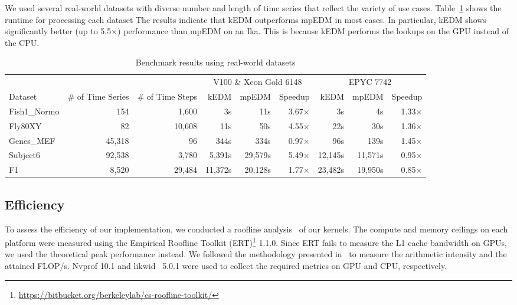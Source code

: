 \documentclass[conference]{IEEEtran}
\begin{document}
We used several real-world datasets with diverse number and length of time
series that reflect the variety of use cases.
Table~\ref{tbl:real-world} shows the runtime for processing each dataset The
results indicate that kEDM outperforms mpEDM in most cases. In particular,
kEDM shows significantly better (up to 5.5$\times$) performance than mpEDM on
an Ika\@. This is because kEDM performs the lookups on the GPU instead of the
CPU\@.

\begin{table}
\centering
\caption{Benchmark results using real-world datasets}%
\label{tbl:real-world}
\begin{tabular}{@{}lrrrrrrrr@{}}
\toprule
             & \multicolumn{1}{c}{} & \multicolumn{1}{c}{} & \multicolumn{3}{c}{V100 \& Xeon Gold 6148 } & \multicolumn{3}{c}{EPYC 7742} \\ \cmidrule(l){4-6}  \cmidrule(l){7-9}
Dataset      & \multicolumn{1}{c}{\# of Time Series} & \multicolumn{1}{c}{\# of Time Steps} & kEDM & mpEDM & Speedup & kEDM & mpEDM & Speedup \\ \midrule
Fish1\_Normo & 154    & 1,600  &      3s &     11s & 3.67$\times$ &      3s &      4s & 1.33$\times$ \\
Fly80XY      & 82     & 10,608 &     11s &     50s & 4.55$\times$ &     22s &     30s & 1.36$\times$ \\
Genes\_MEF   & 45,318 & 96     &    344s &    334s & 0.97$\times$ &     96s &    139s & 1.45$\times$ \\
Subject6     & 92,538 & 3,780  &  5,391s & 29,579s & 5.49$\times$ & 12,145s & 11,571s & 0.95$\times$ \\
F1           & 8,520  & 29,484 & 11,372s & 20,128s & 1.77$\times$ & 23,482s & 19,950s & 0.85$\times$ \\ \bottomrule
\end{tabular}
\end{table}

\subsection{Efficiency}

To assess the efficiency of our implementation, we conducted a roofline
analysis~\cite{Williams2008} of our kernels. The compute and memory ceilings
on each platform were measured using the Empirical Roofline Toolkit (ERT)\footnote{\url{https://bitbucket.org/berkeleylab/cs-roofline-toolkit/}} 1.1.0.
Since ERT fails to measure the L1 cache bandwidth on GPUs, we used the
theoretical peak performance instead. We followed the methodology presented
in~\cite{Yang2020a,Yang2020b} to measure the arithmetic intensity and the
attained FLOP/s. Nvprof 10.1 and likwid~\cite{Treibig2010} 5.0.1 were used to
collect the required metrics on GPU and CPU, respectively.
\end{document}
